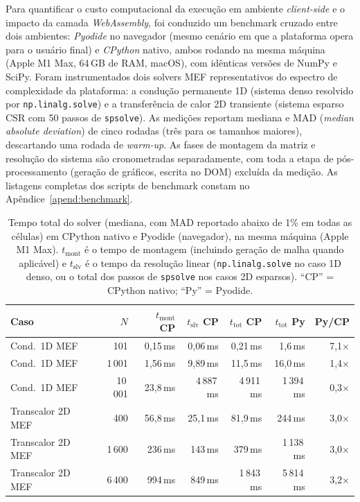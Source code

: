 Para quantificar o custo computacional da execução em ambiente \textit{client-side} e o impacto da camada \textit{WebAssembly}, foi conduzido um benchmark cruzado entre dois ambientes: \textit{Pyodide} no navegador (mesmo cenário em que a plataforma opera para o usuário final) e \textit{CPython} nativo, ambos rodando na mesma máquina (Apple M1 Max, 64\,GB de RAM, macOS), com idênticas versões de NumPy e SciPy. Foram instrumentados dois solvers MEF representativos do espectro de complexidade da plataforma: a condução permanente 1D (sistema denso resolvido por \texttt{np.linalg.solve}) e a transferência de calor 2D transiente (sistema esparso CSR com 50 passos de \texttt{spsolve}). As medições reportam mediana e MAD (\textit{median absolute deviation}) de cinco rodadas (três para os tamanhos maiores), descartando uma rodada de \textit{warm-up}. As fases de montagem da matriz e resolução do sistema são cronometradas separadamente, com toda a etapa de pós-processamento (geração de gráficos, escrita no DOM) excluída da medição. As listagens completas dos scripts de benchmark constam no Apêndice~\ref{apend:benchmark}.

\begin{table}[H]
\centering
\caption{Tempo total do solver (mediana, com MAD reportado abaixo de 1\% em todas as células) em CPython nativo e Pyodide (navegador), na mesma máquina (Apple M1 Max). $t_{\text{mont}}$ é o tempo de montagem (incluindo geração de malha quando aplicável) e $t_{\text{slv}}$ é o tempo da resolução linear (\texttt{np.linalg.solve} no caso 1D denso, ou o total dos passos de \texttt{spsolve} nos casos 2D esparsos). ``CP'' = CPython nativo; ``Py'' = Pyodide.}
\label{tab:benchmark_runtimes}
\small
\setlength{\tabcolsep}{4pt}
\begin{tabular}{lrrrrrr}
\hline
\textbf{Caso} & \textbf{$N$} & \textbf{$t_{\text{mont}}$ CP} & \textbf{$t_{\text{slv}}$ CP} & \textbf{$t_{\text{tot}}$ CP} & \textbf{$t_{\text{tot}}$ Py} & \textbf{Py/CP} \\
\hline
Cond.~1D MEF        & 101     & 0,15\,ms    & 0,06\,ms    & 0,21\,ms    & 1,6\,ms      & 7,1$\times$ \\
Cond.~1D MEF        & 1\,001  & 1,56\,ms    & 9,89\,ms    & 11,5\,ms    & 16,0\,ms     & 1,4$\times$ \\
Cond.~1D MEF        & 10\,001 & 23,8\,ms    & 4\,887\,ms  & 4\,911\,ms  & 1\,394\,ms   & 0,3$\times$ \\
\hline
Transcalor 2D MEF   & 400     & 56,8\,ms    & 25,1\,ms    & 81,9\,ms    & 244\,ms      & 3,0$\times$ \\
Transcalor 2D MEF   & 1\,600  & 236\,ms     & 143\,ms     & 379\,ms     & 1\,138\,ms   & 3,0$\times$ \\
Transcalor 2D MEF   & 6\,400  & 994\,ms     & 849\,ms     & 1\,843\,ms  & 5\,814\,ms   & 3,2$\times$ \\
\hline
\end{tabular}
\end{table}

